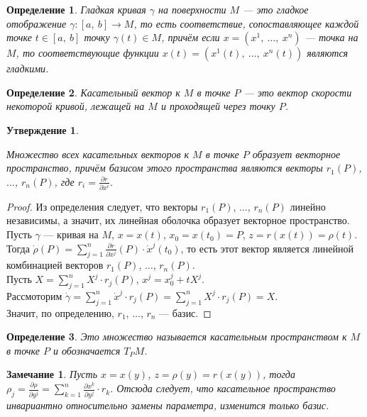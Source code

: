 \documentclass[12pt]{article}
\theoremstyle{plain}
\newtheorem{subtheorem}{Утверждение}[section]
\newtheorem{definition}{Определение}[section]
\newtheorem{remark}{Замечание}
\begin{document}
    \begin{definition}
        Гладкая кривая $\gamma$ на поверхности $M$ --- это гладкое отображение $\gamma:[a, \ b]\to M$, то есть соответствие, сопоставляющее каждой точке $t\in[a, \ b]$ точку $\gamma(t)\in M$, причём если $x=(x^1, \ \ldots, \ x^n)$ --- точка на $M$, то соответствующие функции $x(t)=(x^1(t), \ \ldots, \ x^n(t))$ являются гладкими.
    \end{definition}
    \begin{definition}
        Касательный вектор к $M$ в точке $P$ --- это вектор скорости некоторой кривой, лежащей на $M$ и проходящей через точку $P$.
    \end{definition}
    \begin{subtheorem}
        \hypertarget{5}{}
        Множество всех касательных векторов к $M$ в точке $P$ образует векторное пространство, причём базисом этого пространства являются векторы $r_1(P)$, $\ldots$, $r_n(P)$, где $r_i=\frac{\partial r}{\partial x^i}$.
    \end{subtheorem}
    \begin{proof}
        Из определения следует, что векторы $r_1(P)$, $\ldots$, $r_n(P)$ линейно независимы, а значит, их линейная оболочка образует векторное пространство.\\
        Пусть $\gamma$ --- кривая на $M$, $x=x(t)$, $x_0=x(t_0)=P$, $z=r(x(t))=\rho(t)$.\\Тогда $\dot{\rho}(P)=\sum\limits_{j=1}^n\frac{\partial r}{\partial x^j}(P)\cdot \dot{x}^j(t_0)$, то есть этот вектор является линейной комбинацией векторов $r_1(P)$, $\ldots$, $r_n(P)$.\\
        Пусть $X=\sum\limits_{j=1}^nX^j\cdot r_j(P)$, $x^j=x_0^j+tX^j$.\\Рассмоторим $\dot{\gamma}=\sum\limits_{j=1}^n\dot{x}^j\cdot r_j(P)=\sum\limits_{j=1}^nX^j\cdot r_j(P)=X$.\\Значит, по определению, $r_1$, $\ldots$, $r_n$ --- базис.
    \end{proof}
    \begin{definition}
        Это множество называется касательным пространством к $M$ в точке $P$ и обозначается $T_PM$.
    \end{definition}
    \begin{remark}
        Пусть $x=x(y)$, $z=\rho(y)=r(x(y))$, тогда $\rho_j=\frac{\partial\rho}{\partial y^j}=\sum\limits_{k=1}^n\frac{\partial x^k}{\partial y^j}\cdot r_k$. Отсюда следует, что касательное пространство инвариантно относительно замены параметра, изменится только базис.
    \end{remark}
\end{document}
